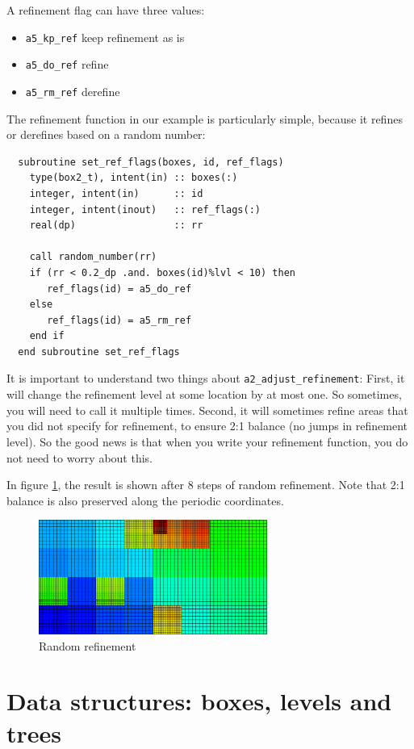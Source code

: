 \documentclass[a4paper, a4wide]{article}
\begin{document}
A refinement flag can have three values:
\begin{itemize}
  \item \texttt{a5\_kp\_ref} keep refinement as is
  \item \texttt{a5\_do\_ref} refine
  \item \texttt{a5\_rm\_ref} derefine
\end{itemize}
The refinement function in our example is particularly simple, because it
refines or derefines based on a random number:
\begin{lstlisting}
  subroutine set_ref_flags(boxes, id, ref_flags)
    type(box2_t), intent(in) :: boxes(:)
    integer, intent(in)      :: id
    integer, intent(inout)   :: ref_flags(:)
    real(dp)                 :: rr

    call random_number(rr)
    if (rr < 0.2_dp .and. boxes(id)%lvl < 10) then
       ref_flags(id) = a5_do_ref
    else
       ref_flags(id) = a5_rm_ref
    end if
  end subroutine set_ref_flags
\end{lstlisting}

It is important to understand two things about \texttt{a2\_adjust\_refinement}:
First, it will change the refinement level at some location by at most one.
So sometimes, you will need to call it multiple times.
Second, it will sometimes refine areas that you did not specify for refinement,
to ensure 2:1 balance (no jumps in refinement level).
So the good news is that when you write your refinement function, you do not
need to worry about this.

In figure \ref{fig:random-refinement}, the result is shown after 8 steps of
random refinement.
Note that 2:1 balance is also preserved along the periodic coordinates.

\begin{figure}
  \centering
  \includegraphics[width=7.5cm]{figures/random_ref.png}
  \caption{Random refinement}
  \label{fig:random-refinement}
\end{figure}

\section{Data structures: boxes, levels and trees}
\label{sec:data-structures}
\end{document}
